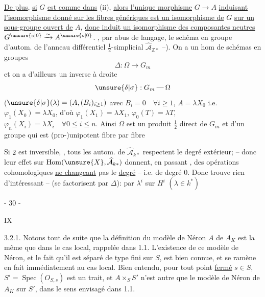 \uline{De plus}, \uline{si} $G$ \uline{est comme dans} (ii), \uline{alors l'unique morphisme}
$G\longrightarrow A$ \uline{induisant l'isomorphisme donné sur les fibres génériques est
un isomorphisme de} $G$ \uline{sur un sous-groupe ouvert de} $A$, \uline{donc induit un
isomorphisme des composantes neutres}
$G^{\unsure{o|0}}\xrightarrow{\sim}A^{\unsure{o|0}}$.
, par abus de langage, le schéma en groupe d'autom. de l'anneau différentiel
$\tfrac12$-simplicial $\widehat{\mathcal A}_{\mathbb Z*}$ --).
On a un hom de schémas en groupes
\[
 \Delta:\Omega\longrightarrow G_m
\]
et on a d'ailleurs un inverse à droite
\[
 \unsure{\delta|\sigma}:G_m\mathbin{\text{---}}\Omega
\]
($\unsure{\delta|\sigma}(\lambda)=(A,(B_i)_{i\geq1})$ avec $B_i=0\quad\forall i\geq1$,
$A=\lambda X_0$ i.e. $\varphi_1(X_0)=\lambda X_0$, d'où $\varphi_1(X_1)=\lambda X_1$,
$\varphi_0(T)=\lambda T$, $\varphi_n(X_i)=\lambda X_i\quad\forall0\leq i\leq n$.
Ainsi $\Omega$ est  un produit $\frac12$ direct
de $G_m$ et d'un groupe qui est (pro-)unipotent fibre par fibre

Si $2$ est inversible, 
 , tous les autom. de $\widehat{\mathcal A}_{k*}$
respectent le degré extérieur; -- donc
leur effet sur $\operatorname{Hom}(\unsure{X},\widehat{\mathcal A}_{k*})$
donnent, en passant , des
opérations cohomologiques \uline{ne changeant} pas le \uline{degré} -- i.e. de degré $0$.
Donc  trouve rien d'intéressant
--  (se factorisent par $\Delta$):
 par $\lambda^i$ sur $H^i$ $(\lambda\in k^*)$
\begin{center}- 30 -\end{center}\hfill IX

3.2.1. Notons tout de suite que la définition du modèle de Néron $A$
de $A_K$ est la même que dans le cas local, rappelée dans 1.1. L'existence
de ce modèle de Néron, et le fait qu'il est séparé de type fini sur $S$,
est bien connue, et se ramène en fait immédiatement au cas local.
Bien entendu, pour tout point \uline{fermé} $s\in S$, $S'=\operatorname{Spec}(O_{S,s})$ est un trait,
et $A\times_S S'$ n'est autre que le modèle de Néron de $A_K$ sur $S'$, dans le
sens envisagé dans 1.1.

